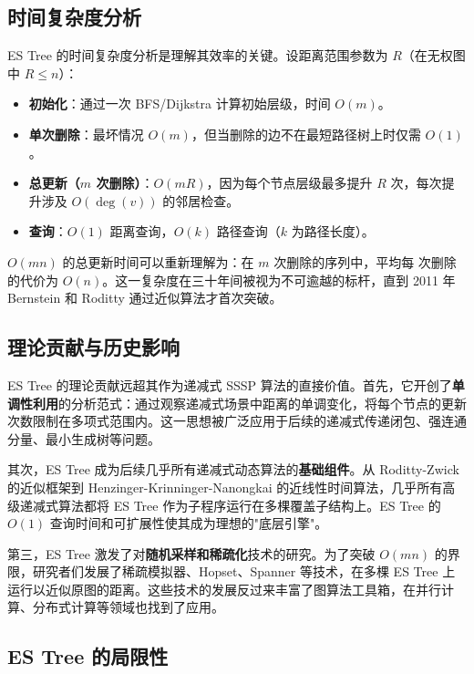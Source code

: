 \documentclass[12pt,a4paper]{ctexart}
\begin{document}
\subsection{时间复杂度分析}

ES Tree 的时间复杂度分析是理解其效率的关键。设距离范围参数为 $R$（在无权图中 $R\leq n$）：

\begin{itemize}
\item \textbf{初始化}：通过一次 BFS/Dijkstra 计算初始层级，时间 $O(m)$。
\item \textbf{单次删除}：最坏情况 $O(m)$，但当删除的边不在最短路径树上时仅需 $O(1)$。
\item \textbf{总更新（$m$ 次删除）}：$O(mR)$，因为每个节点层级最多提升 $R$ 次，每次提升涉及 $O(\deg(v))$ 的邻居检查。
\item \textbf{查询}：$O(1)$ 距离查询，$O(k)$ 路径查询（$k$ 为路径长度）。

\end{itemize}
$O(mn)$ 的总更新时间可以重新理解为：在 $m$ 次删除的序列中，平均每 次删除的代价为 $O(n)$。这一复杂度在三十年间被视为不可逾越的标杆，直到 2011 年 Bernstein 和 Roditty 通过近似算法才首次突破。

\subsection{理论贡献与历史影响}

ES Tree 的理论贡献远超其作为递减式 SSSP 算法的直接价值。首先，它开创了\textbf{单调性利用}的分析范式：通过观察递减式场景中距离的单调变化，将每个节点的更新次数限制在多项式范围内。这一思想被广泛应用于后续的递减式传递闭包、强连通分量、最小生成树等问题。

其次，ES Tree 成为后续几乎所有递减式动态算法的\textbf{基础组件}。从 Roditty-Zwick 的近似框架到 Henzinger-Krinninger-Nanongkai 的近线性时间算法，几乎所有高级递减式算法都将 ES Tree 作为子程序运行在多棵覆盖子结构上。ES Tree 的 $O(1)$ 查询时间和可扩展性使其成为理想的"底层引擎"。

第三，ES Tree 激发了对\textbf{随机采样和稀疏化}技术的研究。为了突破 $O(mn)$ 的界限，研究者们发展了稀疏模拟器、Hopset、Spanner 等技术，在多棵 ES Tree 上运行以近似原图的距离。这些技术的发展反过来丰富了图算法工具箱，在并行计算、分布式计算等领域也找到了应用。

\subsection{ES Tree 的局限性}
\end{document}
